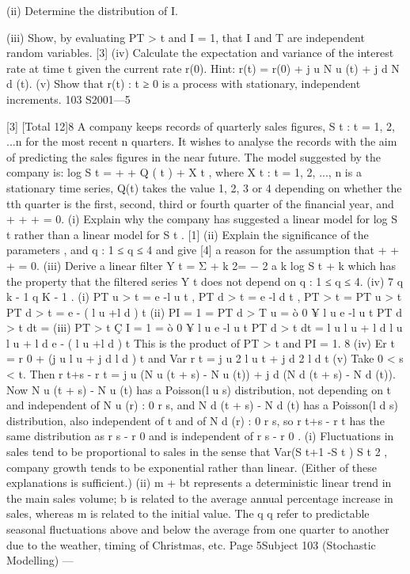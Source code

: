 (ii) Determine the distribution of I.

(iii) Show, by evaluating P{T > t and I = 1}, that I and T are independent
random variables.
[3]
(iv) Calculate the expectation and variance of the interest rate at time t given
the current rate r(0).
Hint: r(t) = r(0) + j u N u (t) + j d N d (t).
(v)
Show that {r(t) : t ≥ 0} is a process with stationary, independent
increments.
103 S2001—5

[3]
[Total 12]8
A company keeps records of quarterly sales figures, {S t : t = 1, 2, ...n} for the most
recent n quarters. It wishes to analyse the records with the aim of predicting the
sales figures in the near future.
The model suggested by the company is:
log S t = \mu + \betat + \theta Q ( t ) + X t ,
where {X t : t = 1, 2, ..., n} is a stationary time series, Q(t) takes the value 1, 2, 3 or
4 depending on whether the tth quarter is the first, second, third or fourth
quarter of the financial year, and  +  +  +  = 0.
(i) Explain why the company has suggested a linear model for log S t rather
than a linear model for S t .
[1]
(ii) Explain the significance of the parameters \mu, \beta and {\theta q : 1 ≤ q ≤ 4} and give
[4]
a reason for the assumption that  +  +  +  = 0.
(iii) Derive a linear filter Y t = Σ + k 2= − 2 a k log S t + k which has the property that the
filtered series {Y t } does not depend on {\theta q : 1 ≤ q ≤ 4}.
(iv)
7
q k - 1
q K - 1
.
(i) P{T u > t} = e -l u t , P{T d > t} = e -l d t , P{T > t} = P{T u > t} P{T d > t} = e - ( l u +l d ) t
(ii) P{I = 1} = P{T d > T u } = ò 0 ¥ l u e -l u t P{T d > t} dt =
(iii) P{T > t Ç I = 1} = ò 0 ¥ l u e -l u t P{T d > t} dt =
l u
l u + l d
l u
l u + l d
e - ( l u +l d ) t
This is the product of P{T > t} and P{I = 1}.
8
(iv) Er t = r 0 + (j u l u + j d l d ) t and Var r t = j u 2 l u t + j d 2 l d t
(v) Take 0 < s < t. Then r t+s - r t = j u (N u (t + s) - N u (t)) + j d (N d (t + s) - N d (t)).
Now N u (t + s) - N u (t) has a Poisson(l u s) distribution, not depending on t
and independent of {N u (r) : 0 \leq r \leq s}, and N d (t + s) - N d (t) has a
Poisson(l d s) distribution, also independent of t and of {N d (r) : 0 \leq r \leq s}, so
r t+s - r t has the same distribution as r s - r 0 and is independent of r s - r 0 .
(i) Fluctuations in sales tend to be proportional to sales in the sense that
Var(S t+1 -S t ) \mu S t 2 , company growth tends to be exponential rather than
linear. (Either of these explanations is sufficient.)
(ii) m + bt represents a deterministic linear trend in the main sales volume; b
is related to the average annual percentage increase in sales, whereas m is
related to the initial value.
The q q refer to predictable seasonal fluctuations above and below the
average from one quarter to another due to the weather, timing of
Christmas, etc.
Page 5Subject 103 (Stochastic Modelling) — 

